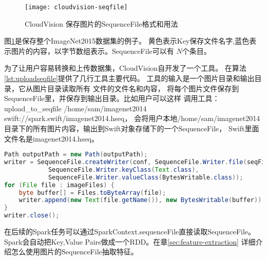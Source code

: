 \begin{figure}[h]
  \centering
    \texttt{[image: cloudvision-seqfile]}
  \caption{CloudVision 保存图片的SequenceFile格式和用法}
  \label{fig:cloudvision-seqfile}
\end{figure}

图\ref{fig:cloudvision-seqfile}是保存整个ImageNet2015数据集的例子。
黄色表示Key保存文件名字,蓝色表示图片的内容，以字节数组表示。SequenceFile可以有
$N$个条目。

为了让用户容易转换和上传数据集，CloudVision自开发了一个工具。
在算法\ref{lst:uploadseqfile}提供了几行工具主要代码。
工具的输入是一个图片目录和输出目录，它从图片目录读取所有
文件的文件名和内容，
将每个图片文件保存到SequenceFile里，并保存到输出目录。比如用户可以这样
调用工具：
upload\_to\_seqfile /home/sam/imagenet2014 swift://spark.swift/imagenet2014.hseq，
会将用户本地/home/sam/imagenet2014目录下的所有图片内容，输出到Swift对象存储下的一个SequenceFile，
Swift里面文件名是imagenet2014.hseq。

\begin{lstlisting}[language=Java,
                   basicstyle=\tiny,
                   showstringspaces=false,
                   caption={UploadToSequenceFile工具},
                   label={lst:uploadseqfile}]
Path outputPath = new Path(outputPath);
writer = SequenceFile.createWriter(conf, SequenceFile.Writer.file(seqFilePath), 
            SequenceFile.Writer.keyClass(Text.class),
            SequenceFile.Writer.valueClass(BytesWritable.class));
for (File file : imageFiles) {
    byte buffer[] = Files.toByteArray(file);
    writer.append(new Text(file.getName()), new BytesWritable(buffer));
}
writer.close();
\end{lstlisting}

在后续的Spark任务可以通过SparkContext.sequenceFile直接读取SequenceFile。
Spark会自动把Key,Value Pairs做成一个RDD。在章\ref{sec:feature-extraction}
详细介绍怎么使用图片的SequenceFile抽取特征。

